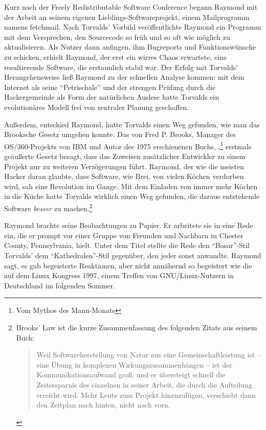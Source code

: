 Kurz nach der Freely Redistributable Software Conference begann Raymond mit der Arbeit an seinem eigenen Lieblings-Softwareprojekt, einem Mailprogramm namens fetchmail. Nach Torvalds' Vorbild veröffentlichte Raymond ein Programm mit dem Versprechen, den Sourcecode so früh und so oft wie möglich zu aktualisieren. Als Nutzer dann anfingen, ihm Bugreports und Funktionswünsche zu schicken, erhielt Raymond, der erst ein wirres Chaos erwartete, eine resultierende Software, die erstaunlich stabil war. Der Erfolg mit Torvalds' Herangehensweise ließ Raymond zu der schnellen Analyse kommen: mit dem Internet als seine "`Petrischale"' und der strengen Prüfung durch die Hackergemeinde als Form der natürlichen Auslese hatte Torvalds ein evolutionäres Modell frei von zentraler Planung geschaffen.

Außerdem, entschied Raymond, hatte Torvalds einen Weg gefunden, wie man das Brooksche Gesetz umgehen konnte. Das von Fred P. Brooks, Manager des OS/360-Projekts von IBM und Autor des 1975 erschienenen Buchs, ,\footnote{Vom Mythos des Mann-Monats} erstmals geäußerte Gesetz besagt, dass das Zuweisen zusätzlicher Entwickler zu einem Projekt nur zu weiteren Verzögerungen führt. Raymond, der wie die meisten Hacker daran glaubte, dass Software, wie Brei, von vielen Köchen verdorben wird, sah eine Revolution im Gange. Mit dem Einladen von immer mehr Köchen in die Küche hatte Torvalds wirklich einen Weg gefunden, die daraus entstehende Software \textit{besser} zu machen.\footnote{Brooks' Law ist die kurze Zusammenfassung des folgenden Zitats aus seinem Buch:
\begin{quote}
Weil Softwareherstellung von Natur aus eine Gemeinschaftleistung ist – eine Übung in komplexen Wirkungszusammenhängen – ist der Kommunikationsaufwand groß, und er übersteigt schnell die Zeitersparnis des einzelnen in seiner Arbeit, die durch die Aufteilung erreicht wird. Mehr Leute zum Projekt hinzuzufügen, verschiebt dann den Zeitplan nach hinten, nicht nach vorn.
\end{quote}
\cite[Vgl.][]{manmonth}
}

Raymond brachte seine Beobachtungen zu Papier. Er arbeitete sie in eine Rede ein, die er prompt vor einer Gruppe von Freunden und Nachbarn in Chester County, Pennsylvania, hielt. Unter dem Titel  stellte die Rede den "`Basar"'-Stil Torvalds' dem "`Kathedralen"'-Stil gegenüber, den jeder sonst anwandte. Raymond sagt, es gab begeisterte Reaktionen, aber nicht annähernd so begeistert wie die auf dem Linux Kongress 1997, einem Treffen von GNU/Linux-Nutzern in Deutschland im folgenden Sommer.

